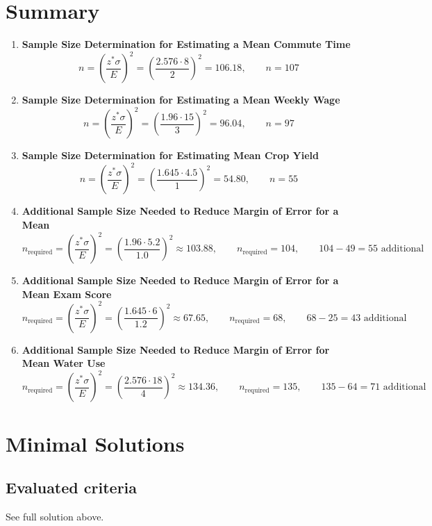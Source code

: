 	\section*{Summary}
	\begin{enumerate}
		\item \textbf{Sample Size Determination for Estimating a Mean Commute Time}
		\[
		n = \left(\frac{z^*\sigma}{E}\right)^2
		= \left(\frac{2.576\cdot 8}{2}\right)^2
		= 106.18,
		\qquad \boxed{n=107}
		\]

		\item \textbf{Sample Size Determination for Estimating a Mean Weekly Wage}
		\[
		n = \left(\frac{z^*\sigma}{E}\right)^2
		= \left(\frac{1.96\cdot 15}{3}\right)^2
		= 96.04,
		\qquad \boxed{n=97}
		\]

		\item \textbf{Sample Size Determination for Estimating Mean Crop Yield}
		\[
		n = \left(\frac{z^*\sigma}{E}\right)^2
		= \left(\frac{1.645\cdot 4.5}{1}\right)^2
		= 54.80,
		\qquad \boxed{n=55}
		\]

		\item \textbf{Additional Sample Size Needed to Reduce Margin of Error for a Mean}
		\[
		n_{\text{required}} = \left(\frac{z^*\sigma}{E}\right)^2
		= \left(\frac{1.96\cdot 5.2}{1.0}\right)^2
		\approx 103.88,
		\qquad \boxed{n_{\text{required}}=104},
		\qquad \boxed{104-49=55\text{ additional}}
		\]

		\item \textbf{Additional Sample Size Needed to Reduce Margin of Error for a Mean Exam Score}
		\[
		n_{\text{required}} = \left(\frac{z^*\sigma}{E}\right)^2
		= \left(\frac{1.645\cdot 6}{1.2}\right)^2
		\approx 67.65,
		\qquad \boxed{n_{\text{required}}=68},
		\qquad \boxed{68-25=43\text{ additional}}
		\]

		\item \textbf{Additional Sample Size Needed to Reduce Margin of Error for Mean Water Use}
		\[
		n_{\text{required}} = \left(\frac{z^*\sigma}{E}\right)^2
		= \left(\frac{2.576\cdot 18}{4}\right)^2
		\approx 134.36,
		\qquad \boxed{n_{\text{required}}=135},
		\qquad \boxed{135-64=71\text{ additional}}
		\]
	\end{enumerate}


\section{Minimal Solutions}

\subsection*{Evaluated criteria}
See full solution above.

